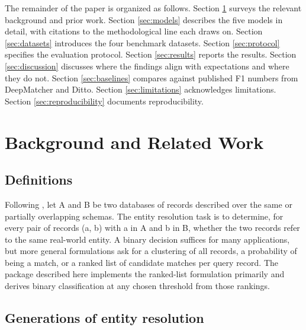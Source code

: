 \documentclass[10pt,letterpaper]{article}
\begin{document}
The remainder of the paper is organized as follows. Section
\ref{sec:background} surveys the relevant background and prior work.
Section \ref{sec:models} describes the five models in detail, with
citations to the methodological line each draws on. Section
\ref{sec:datasets} introduces the four benchmark datasets. Section
\ref{sec:protocol} specifies the evaluation protocol. Section
\ref{sec:results} reports the results. Section \ref{sec:discussion}
discusses where the findings align with expectations and where they
do not. Section \ref{sec:baselines} compares against published F1
numbers from DeepMatcher and Ditto. Section \ref{sec:limitations}
acknowledges limitations. Section \ref{sec:reproducibility} documents
reproducibility.

\section{Background and Related Work}
\label{sec:background}

\subsection{Definitions}

Following \citet{christen2012}, let A and B be two databases of
records described over the same or partially overlapping schemas. The
entity resolution task is to determine, for every pair of records (a,
b) with a in A and b in B, whether the two records refer to the same
real-world entity. A binary decision suffices for many applications,
but more general formulations \citep{binette2022} ask for a clustering
of all records, a probability of being a match, or a ranked list of
candidate matches per query record. The package described here
implements the ranked-list formulation primarily and derives binary
classification at any chosen threshold from those rankings.

\subsection{Generations of entity resolution}
\end{document}
